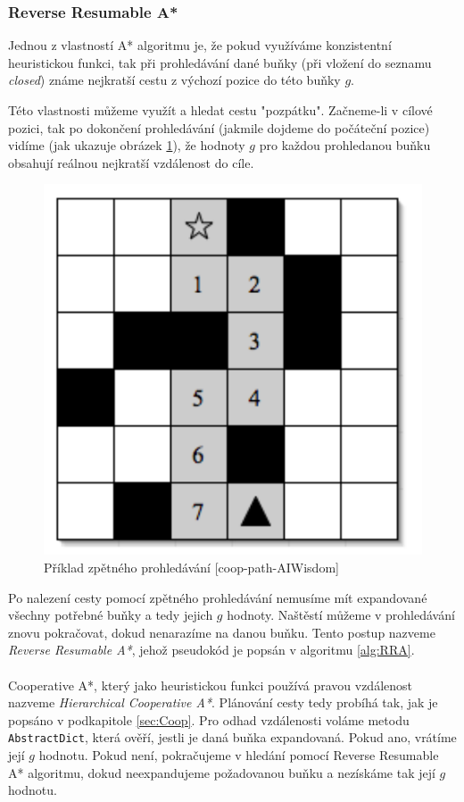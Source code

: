 \subsubsection{Reverse Resumable A*}
Jednou z vlastností A* algoritmu je, že pokud využíváme konzistentní heuristickou funkci, tak při prohledávání dané buňky (při vložení do seznamu \emph{closed}) známe nejkratší cestu z výchozí pozice do této buňky $g$.

Této vlastnosti můžeme využít a hledat cestu "pozpátku". Začneme-li v cílové pozici, tak po dokončení prohledávání (jakmile dojdeme do počáteční pozice) vidíme (jak ukazuje obrázek \ref{obr:backwardsSearch}), že hodnoty $g$ pro každou prohledanou buňku obsahují reálnou nejkratší vzdálenost do cíle.

\begin{figure}[!h]
	\begin{center}
		\includegraphics*[scale=0.5]{obr/backwardsSearch}
	\end{center}
	\caption[caption]{Příklad zpětného prohledávání [coop-path-AIWisdom]}
	\label{obr:backwardsSearch}
\end{figure}

Po nalezení cesty pomocí zpětného prohledávání nemusíme mít expandované všechny potřebné buňky a tedy jejich $g$ hodnoty. Naštěstí můžeme v prohledávání znovu pokračovat, dokud nenarazíme na danou buňku. Tento postup nazveme \emph{Reverse Resumable A*}, jehož pseudokód je popsán v algoritmu \ref{alg:RRA}.
\\
\\
Cooperative A*, který jako heuristickou funkci používá pravou vzdálenost nazveme \emph{Hierarchical Cooperative A*}. Plánování cesty tedy probíhá tak, jak je popsáno v podkapitole \ref{sec:Coop}. Pro odhad vzdálenosti voláme metodu \texttt{AbstractDict}, která ověří, jestli je daná buňka expandovaná. Pokud ano, vrátíme její $g$ hodnotu. Pokud není, pokračujeme v hledání pomocí Reverse Resumable A* algoritmu, dokud neexpandujeme požadovanou buňku a nezískáme tak její $g$ hodnotu.

